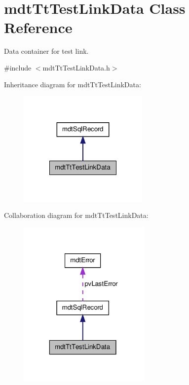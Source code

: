 \hypertarget{classmdt_tt_test_link_data}{\section{mdt\-Tt\-Test\-Link\-Data Class Reference}
\label{classmdt_tt_test_link_data}
}


Data container for test link.  




{\ttfamily \#include $<$mdt\-Tt\-Test\-Link\-Data.\-h$>$}



Inheritance diagram for mdt\-Tt\-Test\-Link\-Data\-:\nopagebreak
\begin{figure}[H]
\begin{center}
\leavevmode
\includegraphics[width=180pt]{classmdt_tt_test_link_data__inherit__graph}
\end{center}
\end{figure}


Collaboration diagram for mdt\-Tt\-Test\-Link\-Data\-:\nopagebreak
\begin{figure}[H]
\begin{center}
\leavevmode
\includegraphics[width=184pt]{classmdt_tt_test_link_data__coll__graph}
\end{center}
\end{figure}
